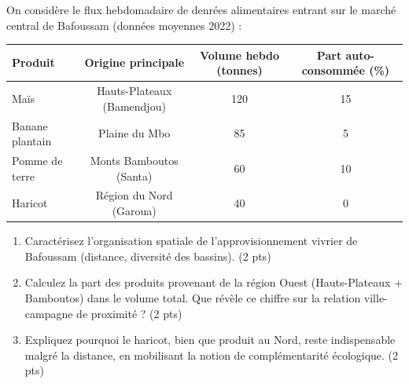 \documentclass[11pt]{article}
\begin{document}
\begin{exercice}
\label{exo:bafoussam}
On considère le flux hebdomadaire de denrées alimentaires entrant sur le marché central de Bafoussam (données moyennes 2022) :

\begin{center}
\begin{tabular}{lccc}
\toprule
\textbf{Produit} & \textbf{Origine principale} & \textbf{Volume hebdo (tonnes)} & \textbf{Part auto-consommée (\%)} \\
\midrule
Maïs & Hauts-Plateaux (Bamendjou) & 120 & 15 \\
Banane plantain & Plaine du Mbo & 85 & 5 \\
Pomme de terre & Monts Bamboutos (Santa) & 60 & 10 \\
Haricot & Région du Nord (Garoua) & 40 & 0 \\
\bottomrule
\end{tabular}
\end{center}
\vspace{0.5em}
\begin{enumerate}
    \item Caractérisez l'organisation spatiale de l'approvisionnement vivrier de Bafoussam (distance, diversité des bassins). \hfill (2 pts)
    \item Calculez la part des produits provenant de la région Ouest (Hauts-Plateaux + Bamboutos) dans le volume total. Que révèle ce chiffre sur la relation ville-campagne de proximité ? \hfill (2 pts)
    \item Expliquez pourquoi le haricot, bien que produit au Nord, reste indispensable malgré la distance, en mobilisant la notion de complémentarité écologique. \hfill (2 pts)
\end{enumerate}
\end{exercice}
\end{document}
